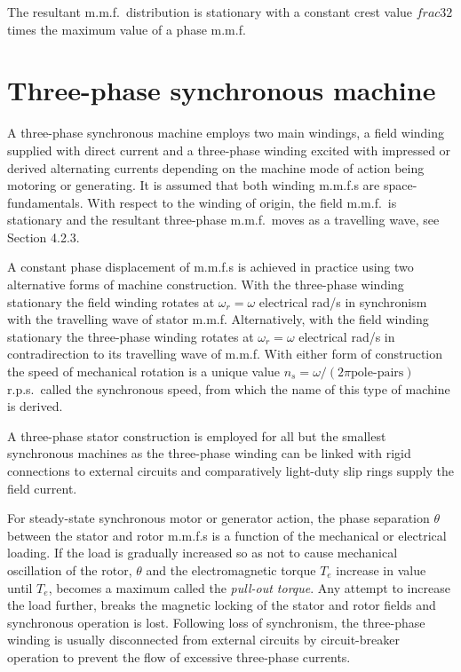 \documentclass[a4paper,numbers=noenddot,12pt]{scrbook}
\begin{document}
The resultant m.m.f.\ distribution is stationary with a constant crest value $frac{3}{2}$ times the maximum value of a phase m.m.f.
\chapter{Three-phase synchronous machine}

A three-phase synchronous machine employs two main windings, a field winding supplied with direct current and a three-phase winding excited with impressed or derived alternating currents depending on the machine mode of action being motoring or generating. It is assumed that both winding m.m.f.s are space-fundamentals. With respect to the winding of origin, the field m.m.f.\ is stationary and the resultant three-phase m.m.f.\ moves as a travelling wave, see Section 4.2.3.

A constant phase displacement of m.m.f.s is achieved in practice using two alternative forms of machine construction. With the three-phase winding stationary the field winding rotates at $\omega_r = \omega$ electrical rad/s in synchronism with the travelling wave of stator m.m.f. Alternatively, with the field winding stationary the three-phase winding rotates at $\omega_r = \omega$ electrical rad/s in contradirection to its travelling wave of m.m.f. With either form of
construction the speed of mechanical rotation is a unique value $n_s = \omega / (2 \pi \text{pole-pairs})$ r.p.s.\ called the synchronous speed, from which the name of this type of machine is derived.

A three-phase stator construction is employed for all but the smallest synchronous machines as the three-phase winding can be linked with rigid connections to external circuits and comparatively light-duty slip rings supply the field current. 

For steady-state synchronous motor or generator action, the phase separation $\theta$ between the stator and rotor m.m.f.s is a function of the mechanical or electrical loading. If the load is gradually increased so as not to cause mechanical oscillation of the rotor, $\theta$ and the electromagnetic torque $T_e$ increase in value until $T_e$, becomes a maximum called the \textit{pull-out torque}. Any attempt to increase the load further, breaks the magnetic locking of the stator and rotor
fields and synchronous operation is lost. Following loss of synchronism, the three-phase winding is usually disconnected from external circuits by circuit-breaker operation to prevent the flow of excessive three-phase currents.
\end{document}

